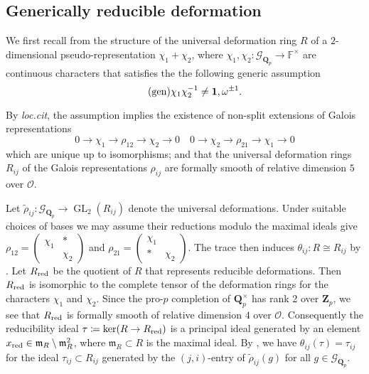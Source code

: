 \documentclass[leqno]{amsart}
\theoremstyle{definition}
\theoremstyle{remark}
\newcommand{\smat}[1]{\left(\begin{smallmatrix} #1 \end{smallmatrix}\right)}
\newcommand{\id}{\mathbf{1}}
\newcommand{\oo}{\mathcal{O}}
\newcommand{\fF}{\mathbb{F}} %
\newcommand{\Qp}{\mathbf{Q}_p}
\newcommand{\Zp}{\mathbf{Z}_p}
\DeclareMathOperator{\GL}{GL}
\newcommand{\fm}{\mathfrak{m}}
\newcommand{\Gp}{\mathcal{G}_{\Qp}} %
\newcommand{\red}{\textnormal{red}}
\newcommand{\xx}{x_\textnormal{red}}
\begin{document}
\subsection{Generically reducible deformation}

We first recall from \cite[\S B.1]{pask}
the structure of the universal deformation ring 
$R$ of a $2$-dimensional pseudo-representation 
$\chi_1+\chi_2$,
where $\chi_1,\chi_2\colon \Gp\to \fF^\times$ 
are continuous characters that satisfies the 
the following generic assumption
\begin{equation}\label{cond:generic}\tag{\text{gen}}
	\chi_1\chi_2^{-1}\neq \id,\omega^{\pm1}.
\end{equation}

By \textit{loc.cit}, the assumption
implies the existence of non-split extensions
of Galois representations
\begin{equation*}
    0\to \chi_1\to \rho_{12}\to \chi_2\to 0\quad
    0\to \chi_2\to \rho_{21}\to \chi_1\to 0
\end{equation*}
which are unique up to isomorphisms;
and that the universal deformation rings
$R_{ij}$ of the Galois representations $\rho_{ij}$
are formally smooth of relative dimension $5$ over $\oo$.


Let $\tilde{\rho}_{ij}\colon \Gp\to\GL_2(R_{ij})$
denote the universal deformations.
Under suitable choices of bases we may assume
their reductions modulo the maximal ideals give
$\rho_{12}=\smat{\chi_1&*\\&\chi_2}$ and
$\rho_{21}=\smat{\chi_1&\\ *&\chi_2}$.
The trace then induces 
$\theta_{ij}\colon R\cong R_{ij}$
by \cite[Prop B.17]{pask}.
Let $R_{\red}$ be the quotient of $R$
that represents reducible deformations.
Then $R_{\red}$ is isomorphic
to the complete tensor of the
deformation rings for the characters $\chi_1$ and $\chi_2$.
Since the pro-$p$ completion of $\Qp^\times$
has rank 2 over $\Zp$,
we see that $R_{\red}$ is formally smooth of
relative dimension $4$ over $\oo$.
Consequently the reducibility ideal 
$\tau\coloneqq \ker(R\to R_{\red})$ 
is a principal ideal generated by 
an element $\xx\in\fm_R\setminus \fm_R^2$,
where $\fm_R\subset R$ is the maximal ideal.
By \cite[Prop B.23]{pask},
we have $\theta_{ij}(\tau)=\tau_{ij}$
for the ideal $\tau_{ij}\subset R_{ij}$
generated by the $(j,i)$-entry of $ \tilde{\rho}_{ij}(g)$
for all $g\in \Gp$.
\end{document}
